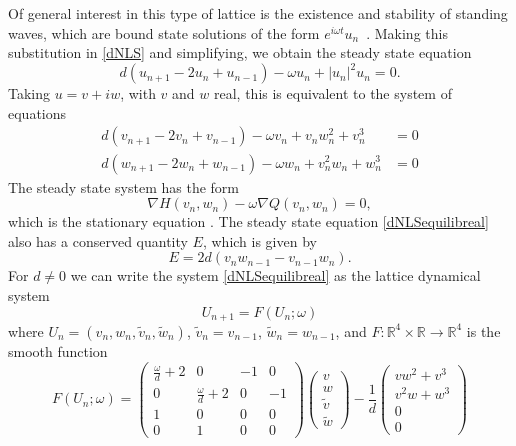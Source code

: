 \documentclass[12pt]{article}
\def\R{{\mathbb R}}
\begin{document}
Of general interest in this type of lattice is the existence and stability of standing waves, which are bound state solutions of the form $e^{i \omega t}u_n$~\cite{alfimov}. Making this substitution in \eqref{dNLS} and simplifying, we obtain the steady state equation
\begin{equation}\label{dNLSequilib}
d(u_{n+1} - 2 u_n + u_{n-1}) - \omega u_n + |u_n|^2 u_n = 0.
\end{equation}
Taking $u = v + i w$, with $v$ and $w$ real, this is equivalent to the system of equations
\begin{equation}\label{dNLSequilibreal}
\begin{aligned}
d (v_{n+1} - 2 v_n + v_{n-1}) - \omega v_n + v_n w_n^2 + v_n^3 &= 0 \\
d (w_{n+1} - 2 w_n + w_{n-1}) - \omega w_n + v_n^2 w_n + w_n^3 &= 0
\end{aligned}
\end{equation}
The steady state system has the form
\begin{equation}
\nabla H(v_n, w_n) - \omega \nabla Q(v_n, w_n) = 0,
\end{equation}
which is the stationary equation \cite[(2.15)]{Grillakis1987}. The steady state equation \eqref{dNLSequilibreal} also has a conserved quantity $E$, which is given by
\begin{equation}\label{dNLSE}
E = 2d(v_n w_{n-1} - v_{n-1} w_n).
\end{equation}
For $d \neq 0$ we can write the system  \eqref{dNLSequilibreal} as the lattice dynamical system
\begin{equation}\label{DNLSlattice1}
U_{n+1} = F(U_n; \omega)
\end{equation}
where $U_n = (v_n, w_n, \tilde{v}_n, \tilde{w}_n)$, $\tilde{v}_n = v_{n-1}$, $\tilde{w}_n = w_{n-1}$, and $F:\R^4 \times \R \rightarrow \R^4$ is the smooth function
\begin{equation}\label{FdNLS}
F(U_n; \omega) =
\begin{pmatrix}
\frac{\omega}{d} + 2 & 0 & -1 & 0 \\
0 & \frac{\omega}{d} + 2 &  0 & -1 \\
1 & 0 & 0 & 0 \\
0 & 1 & 0 & 0
\end{pmatrix}
\begin{pmatrix}
v \\ w \\ \tilde{v} \\ \tilde{w}
\end{pmatrix}
- \frac{1}{d} 
\begin{pmatrix}
v w^2 + v^3 \\ v^2 w + w^3 \\ 0 \\ 0
\end{pmatrix}
\end{equation}
\end{document}
